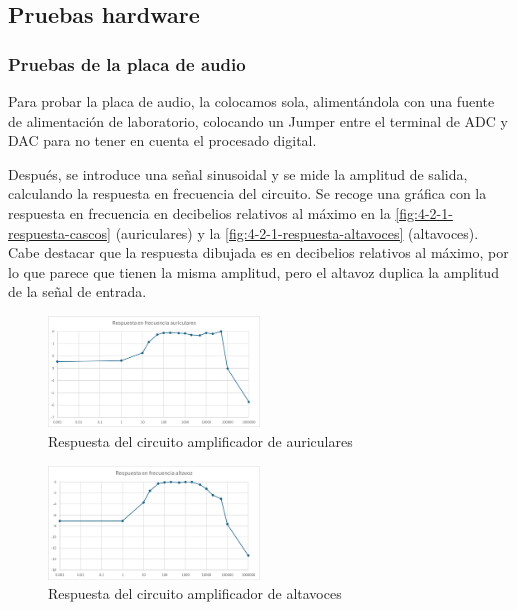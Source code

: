 \subsection{Pruebas hardware}

\subsubsection{Pruebas de la placa de audio}

Para probar la placa de audio, la colocamos sola, alimentándola con una fuente de alimentación de laboratorio, colocando un Jumper entre el terminal de ADC y DAC para no tener en cuenta el procesado digital.

Después, se introduce una señal sinusoidal y se mide la amplitud de salida, calculando la respuesta en frecuencia del circuito. Se recoge una gráfica con la respuesta en frecuencia en decibelios relativos al máximo en la \autoref{fig:4-2-1-respuesta-cascos} (auriculares) y la \autoref{fig:4-2-1-respuesta-altavoces} (altavoces). Cabe destacar que la respuesta dibujada es en decibelios relativos al máximo, por lo que parece que tienen la misma amplitud, pero el altavoz duplica la amplitud de la señal de entrada.

\begin{figure}[h]
    \centering
    \includegraphics[width=0.5\textwidth]{images/4/4-2/respuesta-auriculares.png}
    \caption{Respuesta del circuito amplificador de auriculares}
    \label{fig:4-2-1-respuesta-cascos}
\end{figure}

\begin{figure}[h]
    \centering
    \includegraphics[width=0.5\textwidth]{images/4/4-2/respuesta-altavoces.png}
    \caption{Respuesta del circuito amplificador de altavoces}
    \label{fig:4-2-1-respuesta-altavoces}
\end{figure}

